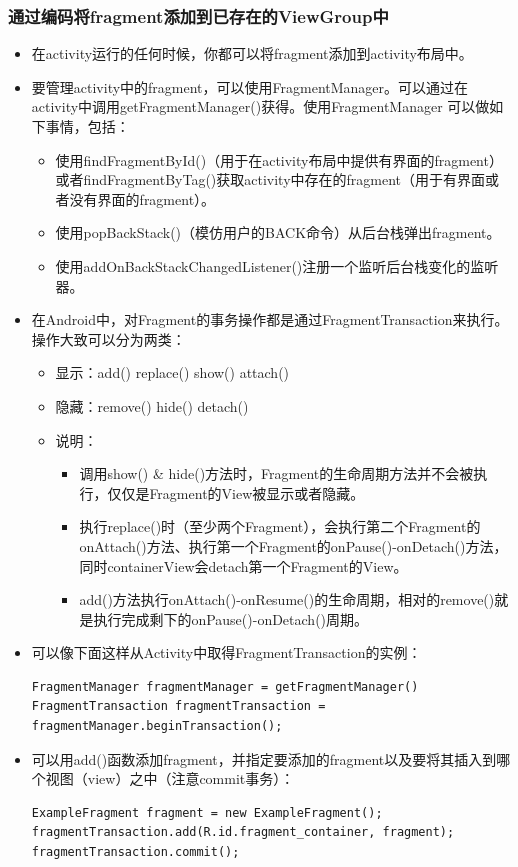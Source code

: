 \documentclass[9pt, b5paper]{article}
\begin{document}
\subsubsection{通过编码将fragment添加到已存在的ViewGroup中}
\label{sec-2-3-2}
\begin{itemize}
\item 在activity运行的任何时候，你都可以将fragment添加到activity布局中。
\item 要管理activity中的fragment，可以使用FragmentManager。可以通过在activity中调用getFragmentManager()获得。使用FragmentManager 可以做如下事情，包括：
\begin{itemize}
\item 使用findFragmentById()（用于在activity布局中提供有界面的fragment）或者findFragmentByTag()获取activity中存在的fragment（用于有界面或者没有界面的fragment）。　　
\item 使用popBackStack()（模仿用户的BACK命令）从后台栈弹出fragment。　　
\item 使用addOnBackStackChangedListener()注册一个监听后台栈变化的监听器。
\end{itemize}
\item 在Android中，对Fragment的事务操作都是通过FragmentTransaction来执行。操作大致可以分为两类：
\begin{itemize}
\item 显示：add() replace() show() attach()　　
\item 隐藏：remove() hide() detach()　
\item 说明：
\begin{itemize}
\item 调用show() \& hide()方法时，Fragment的生命周期方法并不会被执行，仅仅是Fragment的View被显示或者​隐藏。
\item 执行replace()时（至少两个Fragment），会执行第二个Fragment的onAttach()方法、执行第一个Fragment的onPause()-onDetach()方法，同时containerView会detach第一个Fragment的View。
\item add()方法执行onAttach()-onResume()的生命周期，相对的remove()就是执行完成剩下的onPause()-onDetach()周期。
\end{itemize}
\end{itemize}
\item 可以像下面这样从Activity中取得FragmentTransaction的实例：
\begin{verbatim}
FragmentManager fragmentManager = getFragmentManager()　
FragmentTransaction fragmentTransaction = fragmentManager.beginTransaction();
\end{verbatim}
\item 可以用add()函数添加fragment，并指定要添加的fragment以及要将其插入到哪个视图（view）之中（注意commit事务）：
\begin{verbatim}
ExampleFragment fragment = new ExampleFragment();
fragmentTransaction.add(R.id.fragment_container, fragment);
fragmentTransaction.commit();
\end{verbatim}
\end{itemize}
\end{document}
